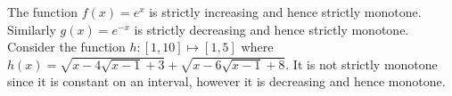 \documentclass[12pt]{article}
\begin{document}
The function $f(x)=e^{x}$ is strictly increasing and hence strictly monotone. Similarly $g(x)=e^{-x}$ is strictly decreasing and hence strictly monotone. Consider the function $h : [1,10] \mapsto [1,5]$ where $h(x)=\sqrt{x-4\sqrt{x-1}+3}+\sqrt{x-6\sqrt{x-1}+8}$. It is not strictly monotone since it is constant on an interval, however it is decreasing and hence monotone.
\end{document}
